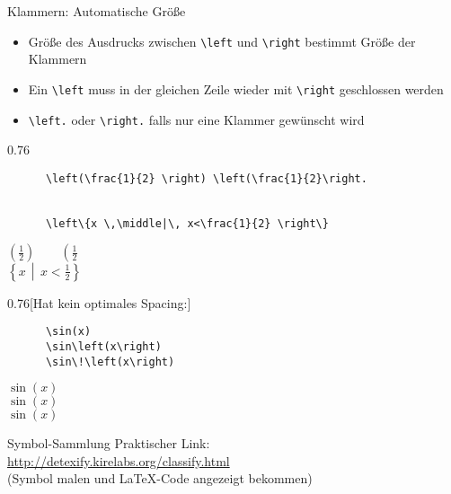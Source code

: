 \begin{frame}[fragile]{Klammern: Automatische Größe}
  \begin{itemize}
    \item Größe des Ausdrucks zwischen \lstinline+\left+ und \lstinline+\right+ bestimmt Größe der Klammern
    \item Ein \lstinline+\left+ muss in der gleichen Zeile wieder mit \lstinline+\right+ geschlossen werden
    \item \lstinline+\left.+ oder \lstinline+\right.+ falls nur eine Klammer gewünscht wird
  \end{itemize}
  \begin{CodeExample}{0.76}
    \begin{lstlisting}
      \left(\frac{1}{2} \right) \left(\frac{1}{2}\right.


      \left\{x \,\middle|\, x<\frac{1}{2} \right\}
    \end{lstlisting}
  \CodeResult
    $\left(\frac{1}{2}\right) \qquad \left(\frac{1}{2}\right.$ \\[2\baselineskip]
      $\left\{ x \, \middle| \, x < \frac{1}{2} \right\}$
  \end{CodeExample}

  \begin{CodeExample}{0.76}[Hat kein optimales Spacing:]
    \begin{lstlisting}
      \sin(x)
      \sin\left(x\right)
      \sin\!\left(x\right)
    \end{lstlisting}
  \CodeResult
    $\sin(x)$ \\
    $\sin\left(x\right)$ \\
    $\sin\!\left(x\right)$
  \end{CodeExample}
\end{frame}

\begin{frame}[fragile]{
  Symbol-Sammlung
  \hfill{}
  \hfill{}
}
  Praktischer Link: \\
  \url{http://detexify.kirelabs.org/classify.html} \\
  (Symbol malen und \LaTeX-Code angezeigt bekommen)
\end{frame}

